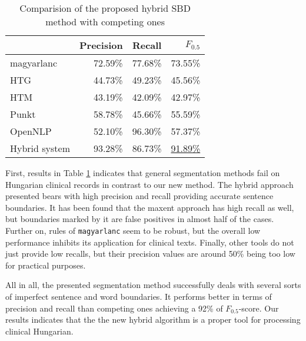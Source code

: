 \begin{table}[h]
\centering
\caption{Comparision of the proposed hybrid SBD method with competing ones}
\label{tab:comparison}
\begin{tabular}{ l r r r} 
\hline
& Precision & Recall & $F_{0.5}$ \\
\hline
magyarlanc & 72.59\% & 77.68\% & 73.55\% \\
HTG & 44.73\% & 49.23\% & 45.56\% \\
HTM & 43.19\% & 42.09\% & 42.97\% \\
Punkt & 58.78\% & 45.66\% & 55.59\%  \\
OpenNLP & 52.10\% & 96.30\% & 57.37\% \\
Hybrid system & 93.28\% & 86.73\% & \underline{91.89\%} \\
\hline
\end{tabular}
\end{table}

First, results in Table \ref{tab:comparison} indicates that general segmentation methods fail on Hungarian clinical records in contrast to our new method. The hybrid approach presented bears with high precision and recall providing accurate sentence boundaries.
It has been found that the maxent approach has high recall as well, but boundaries marked by it are false positives in almost half of the cases. 
Further on, rules of \texttt{magyarlanc} seem to be robust, but the overall low performance inhibits its application for clinical texts. 
Finally, other tools do not just provide low recalls, but their precision values are around 50\% being too low for practical purposes. 

All in all, the presented segmentation method successfully deals with several sorts of imperfect sentence and word boundaries.
It performs better in terms of precision and recall than competing ones achieving a 92\% of $F_{0.5}$-score. Our results indicates that the the new hybrid algorithm is a proper tool for processing clinical Hungarian.



